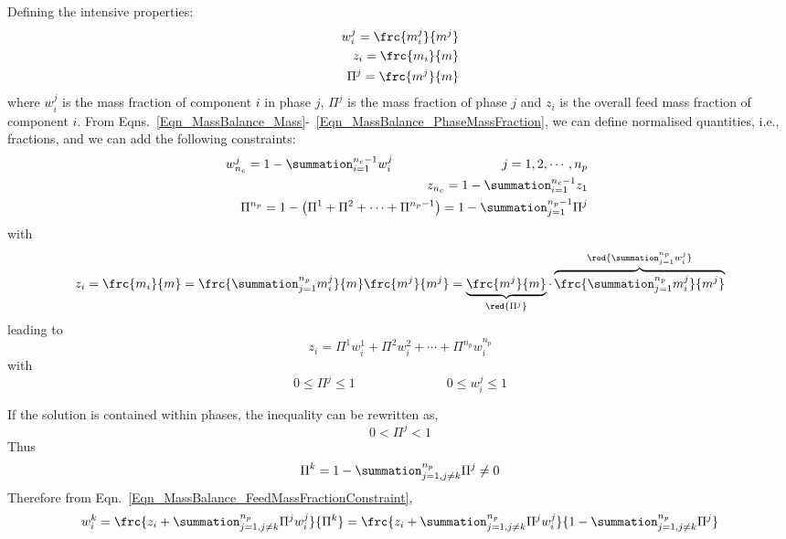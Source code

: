 Defining the intensive properties:
\begin{eqnarray}
w_{i}^{j} = \frc{m_{i}^{j}}{m^{j}} \label{Eqn_MassBalance_MassFraction} \\
z_{i} = \frc{m_{i}}{m} \label{Eqn_MassBalance_MassFractionFeeding} \\
\Pi^{j} = \frc{m^{j}}{m}\label{Eqn_MassBalance_PhaseMassFraction} 
\end{eqnarray}
where $w_{i}^{j}$ is the mass fraction of component $i$ in phase $j$, $\Pi^{j}$ is the mass fraction of phase $j$ and $z_{i}$ is the overall feed mass fraction of component $i$. From Eqns.~\ref{Eqn_MassBalance_Mass}-~\ref{Eqn_MassBalance_PhaseMassFraction}, we can define normalised quantities, i.e., fractions, and we can add the following constraints:
\begin{eqnarray}
&&w_{n_{c}}^{j} = 1 - \summation_{i=1}^{n_{c}-1}w_{i}^{j}  \hspace{3cm} j=1,2,\cdots,n_{p}  \label{Eqn_MassBalance_MassFraction2} \\
&&z_{n_{c}} = 1 - \summation_{i=1}^{n_{c}-1}z_{1}  \\
&&\Pi^{n_{p}} = 1 - \left(\Pi^{1} + \Pi^{2} + \cdots + \Pi^{n_{p}-1}\right) = 1 - \summation_{j=1}^{n_{p}-1} \Pi^{j}\label{Eqn_MassBalance_PhaseMassFraction2}
\end{eqnarray} 
with
\begin{displaymath}
  z_{i} = \frc{m_{i}}{m} = \frc{\summation_{j=1}^{n_{p}}m_{i}^{j}}{m} \frc{m^{j}}{m^{j}} = \underbrace{\frc{m^{j}}{m}}_{\red{\Pi^{j}}} \cdot \overbrace{\frc{\summation_{j=1}^{n_{p}}m_{i}^{j}}{m^{j}}}^{\red{\summation_{j=1}^{n_{p}}w_{i}^{j}}} 
\end{displaymath}
leading to
\begin{equation}
z_{i} = \Pi^{1}w_{i}^{1} + \Pi^{2}w_{i}^{2} + \cdots + \Pi^{n_{p}}w_{i}^{n_{p}}
\label{Eqn_MassBalance_FeedMassFractionConstraint}
\end{equation}
with
\begin{equation}
0\leq\Pi^{j}\leq 1 \hspace{3cm} 0\leq w_{i}^{j}\leq 1
\end{equation}

If the solution is contained within  phases, the inequality can be rewritten as,
\begin{equation}
0 < \Pi^{j} < 1
\end{equation}
Thus 
\begin{displaymath}
\Pi^{k} = 1 - \summation_{j=1,j\neq k}^{n_{p}} \Pi^{j} \neq 0
\end{displaymath}
Therefore from Eqn.~\ref{Eqn_MassBalance_FeedMassFractionConstraint},
\begin{equation}
w_{i}^{k} = \frc{z_{i}+\summation_{j=1,j\neq k}^{n_{p}}\Pi^{j}w_{i}^{j}}{\Pi^{k}} = \frc{z_{i} + \summation_{j=1,j\neq k}^{n_{p}}\Pi^{j}w_{i}^{j}}{1-\summation_{j=1,j\neq k}^{n_{p}}\Pi^{j}}
\label{Eqn_MassBalance_FeedMassFractionConstraint2}
\end{equation}




